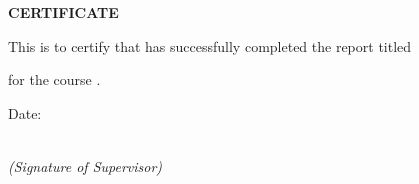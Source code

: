 \documentclass[12pt]{article}
\begin{document}
\begin{center}
{\LARGE \textbf{CERTIFICATE}}
\end{center}

\vspace{1.5cm}

This is to certify that \underline{\hspace{6cm}} has successfully completed the report titled

\vspace{0.5cm}
\centerline{\underline{\hspace{10cm}}}

\vspace{0.5cm}
for the course \underline{\hspace{6cm}}.

\vspace{2cm}
\begin{flushright}

Date: \underline{\hspace{4cm}}
\vspace{2cm}

\underline{\hspace{7cm}} \\
\textit{(Signature of Supervisor)}

\end{flushright}
\end{document}

